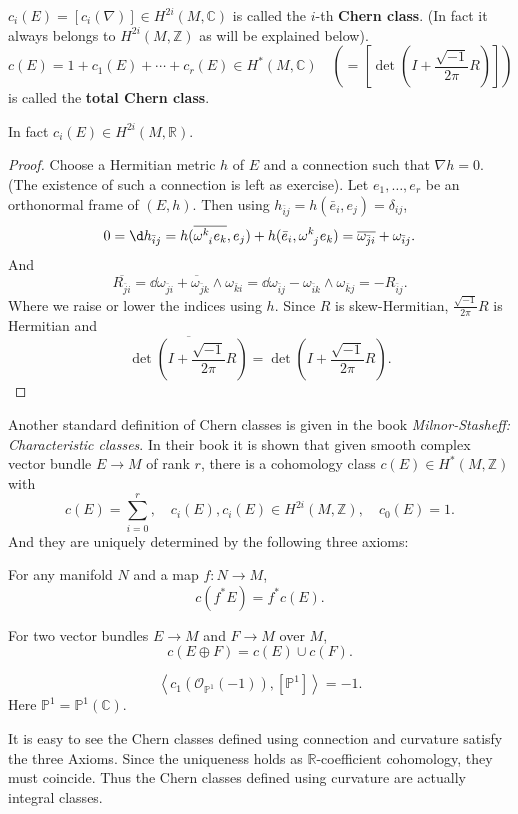 \documentclass[12pt]{article}
\begin{document}
\begin{definition}
  \(c_i(E)=[c_i(\nabla)]\in H^{2i}(M,\mathbb{C})\) is called the \(i\)-th
  \textbf{Chern class}. (In fact it always belongs to \(H^{2i}(M,\mathbb{Z})\)
  as will be explained below). \[
    c(E)=1+c_1(E)+\cdots +c_r(E)\in H^*(M,\mathbb{C})
    \quad(=[\det(I+\frac{\sqrt{-1}}{2\pi}R)])
  \] is called the \textbf{total Chern class}.
\end{definition}

\begin{lemma}
  In fact \(c_i(E)\in H^{2i}(M,\mathbb{R})\).
\end{lemma}
\begin{proof}
  Choose a Hermitian metric \(h\) of \(E\) and a connection such that
  \(\nabla h=0\). (The existence of such a connection is left as exercise).
  Let \(e_1,\ldots,e_r\) be an orthonormal frame of \((E,h)\). Then using
  \(h_{\bar{i}j}=h(\bar{e}_i,e_j)=\delta_{ij}\), \[
    0=\dd{h_{\bar{i}j}}=h(\overline{\omega\indices{^k_i}e_k},e_j)
    +h(\bar{e}_i,\omega\indices{^k_j}e_k)=\overline{\omega_{\bar{j}i}}
    +\omega_{\bar{i}j}
  .\] And \[
    \overline{R_{\bar{j}i}}=\overline{\dd{\omega_{\bar{j}i}}+\omega_{\bar{j}k}
    \wedge\omega_{\bar{k}i}}=\dd{\omega_{\bar{i}j}}-\omega_{\bar{i}k}\wedge 
    \omega_{\bar{k}j}=-R_{\bar{i}j}
  .\] Where we raise or lower the indices using \(h\). Since \(R\) is
  skew-Hermitian, \(\frac{\sqrt{-1}}{2\pi}R\) is Hermitian and \[
    \overline{\det(I+\frac{\sqrt{-1}}{2\pi}R)}=\det(I+\frac{\sqrt{-1}}{2\pi}R)
  .\] 
\end{proof}

Another standard definition of Chern classes is given in the book
\emph{Milnor-Stasheff: Characteristic classes}. In their book it is shown that
given smooth complex vector bundle \(E\to M\) of rank \(r\), there is a 
cohomology class \(c(E)\in H^*(M,\mathbb{Z})\) with \[
  c(E)=\sum_{i=0}^{r},\quad c_i(E),c_i(E)\in H^{2i}(M,\mathbb{Z}),\quad c_0(E)=1
.\] And they are uniquely determined by the following three axioms:

\begin{axiom}[Naturality]
  For any manifold \(N\) and a map \(f\colon N\to M\), \[
    c(f^*E)=f^*c(E)
  .\] 
\end{axiom}
\begin{axiom}
  For two vector bundles \(E\to M\) and \(F\to M\) over \(M\), \[
    c(E\oplus F)=c(E)\cup c(F)
  .\] 
\end{axiom}
\begin{axiom}[Normalization]
   \[
     \left<c_1(\mathcal{O}_{\mathbb{P}^1}(-1)),[\mathbb{P}^1]\right> =-1
   .\] Here \(\mathbb{P}^1=\mathbb{P}^1(\mathbb{C})\).
\end{axiom}
It is easy to see the Chern classes defined using connection and curvature 
satisfy the three Axioms. Since the uniqueness holds as
\(\mathbb{R}\)-coefficient cohomology, they must coincide. Thus the Chern
classes defined using curvature are actually integral classes.
\end{document}
